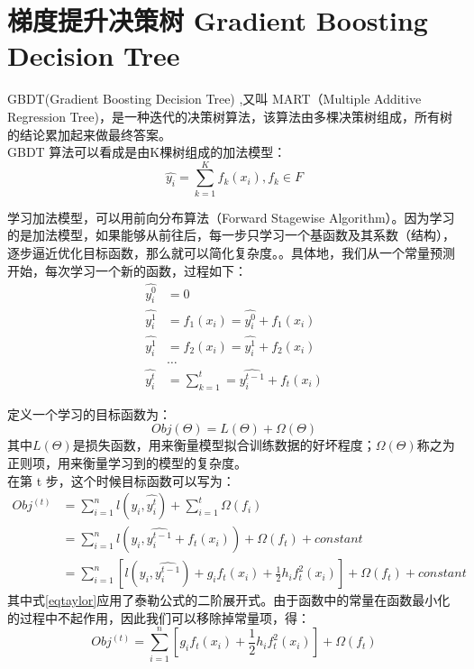 \documentclass[a4paper]{article}
\begin{document}
\section{梯度提升决策树 Gradient Boosting Decision Tree}

GBDT(Gradient Boosting Decision Tree) ,又叫 MART（Multiple Additive Regression Tree)，是一种迭代的决策树算法，该算法由多棵决策树组成，所有树的结论累加起来做最终答案。\\

GBDT 算法可以看成是由K棵树组成的加法模型：
\begin{equation}
\hat{y_i}=\sum_{k=1}^{K}f_k(x_i),f_k\in F
\end{equation}

学习加法模型，可以用前向分布算法（Forward Stagewise Algorithm）。因为学习的是加法模型，如果能够从前往后，每一步只学习一个基函数及其系数（结构），逐步逼近优化目标函数，那么就可以简化复杂度。。具体地，我们从一个常量预测开始，每次学习一个新的函数，过程如下：
\begin{align}
	\hat{y_i^0}&=0\\
	\hat{y_i^1}&=f_1(x_i)=\hat{y_i^0}+f_1(x_i)\\
	\hat{y_i^1}&=f_2(x_i)=\hat{y_i^1}+f_2(x_i)\\
	&\ldots\\
	\hat{y_i^t}&=\sum_{k=1}^{t}=\hat{y_i^{t-1}}+f_t(x_i)
\end{align}

定义一个学习的目标函数为：
\begin{equation}
Obj(\Theta)=L(\Theta)+\Omega(\Theta)
\end{equation}
其中$L(\Theta)$是损失函数，用来衡量模型拟合训练数据的好坏程度；$\Omega(\Theta)$称之为正则项，用来衡量学习到的模型的复杂度。\\

在第 t 步，这个时候目标函数可以写为：
\begin{align}
Obj^{(t)}&=\sum_{i=1}^{n} l(y_i,\hat{y_i^t})+\sum_{i=1}^{t}\Omega(f_i)\\
&=\sum_{i=1}^{n} l(y_i,\hat{y_i^{t-1}}+f_t(x_i))+\Omega(f_t)+constant\\
&=\sum_{i=1}^{n} [l(y_i,\hat{y_i^{t-1}})+g_i f_t(x_i)+\frac{1}{2}h_i f^2_t(x_i)]+\Omega(f_t)+constant\label{eqtaylor}
\end{align}
其中式\ref{eqtaylor}应用了泰勒公式的二阶展开式。由于函数中的常量在函数最小化的过程中不起作用，因此我们可以移除掉常量项，得：
\begin{equation}\label{eqobj}
Obj^{(t)}=\sum_{i=1}^{n} [g_i f_t(x_i)+\frac{1}{2}h_i f^2_t(x_i)]+\Omega(f_t)
\end{equation}
\end{document}
